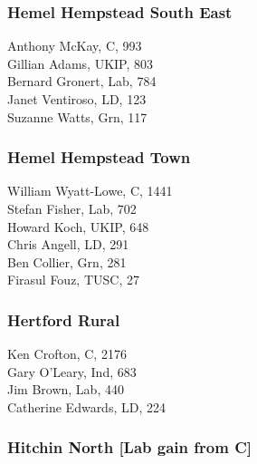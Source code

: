 \documentclass[a4paper,openany,10pt]{book}
\begin{document}
\subsubsection*{Hemel Hempstead South East}



Anthony McKay, C, 993\\
Gillian Adams, UKIP, 803\\
Bernard Gronert, Lab, 784\\
Janet Ventiroso, LD, 123\\
Suzanne Watts, Grn, 117\\


\subsubsection*{Hemel Hempstead Town}



William Wyatt-Lowe, C, 1441\\
Stefan Fisher, Lab, 702\\
Howard Koch, UKIP, 648\\
Chris Angell, LD, 291\\
Ben Collier, Grn, 281\\
Firasul Fouz, TUSC, 27\\


\subsubsection*{Hertford Rural}



Ken Crofton, C, 2176\\
Gary O'Leary, Ind, 683\\
Jim Brown, Lab, 440\\
Catherine Edwards, LD, 224\\


\subsubsection*{Hitchin North \hspace*{\fill}\nolinebreak[1]%
\enspace\hspace*{\fill}
[Lab gain from C]}
\end{document}

